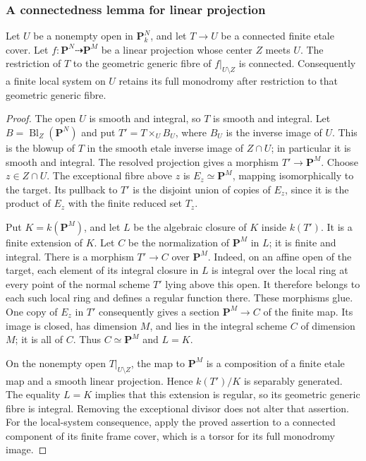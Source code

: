 \subsubsection{A connectedness lemma for linear projection}

\begin{lemma}\label{lem:linear-projection-monodromy}
Let $U$ be a nonempty open in $\mathbf P^N_k$, and let
$T\to U$ be a connected finite etale cover.  Let
$f:\mathbf P^N\dashrightarrow\mathbf P^M$ be a linear projection
whose center $Z$ meets $U$.  The restriction of $T$ to the
geometric generic fibre of $f|_{U\setminus Z}$ is connected.
Consequently a finite local system on $U$ retains its full
monodromy after restriction to that geometric generic fibre.
\end{lemma}

\begin{proof}
The open $U$ is smooth and integral, so $T$ is smooth and integral.
Let $B=\operatorname{Bl}_Z(\mathbf P^N)$ and put
$T'=T\times_U B_U$, where $B_U$ is the inverse image of $U$.
This is the blowup of $T$ in the smooth etale inverse image of
$Z\cap U$; in particular it is smooth and integral.  The resolved
projection gives a morphism $T'\to\mathbf P^M$.
Choose $z\in Z\cap U$.  The exceptional fibre above $z$ is
$E_z\simeq\mathbf P^M$, mapping isomorphically to the target.
Its pullback to $T'$ is the disjoint union of copies of $E_z$,
since it is the product of $E_z$ with the finite reduced set $T_z$.

Put $K=k(\mathbf P^M)$, and let $L$ be the algebraic closure of $K$
inside $k(T')$.  It is a finite extension of $K$.  Let $C$ be the
normalization of $\mathbf P^M$ in $L$; it is finite and integral.
There is a morphism $T'\to C$ over $\mathbf P^M$.  Indeed, on an
affine open of the target, each element of its integral closure
in $L$ is integral over the local ring at every point of the
normal scheme $T'$ lying above this open.  It therefore belongs
to each such local ring and defines a regular function there.
These morphisms glue.  One copy of $E_z$ in $T'$ consequently
gives a section $\mathbf P^M\to C$ of the finite map.
Its image is closed, has dimension $M$, and lies in the integral
scheme $C$ of dimension $M$; it is all of $C$.  Thus $C\simeq
\mathbf P^M$ and $L=K$.

On the nonempty open $T|_{U\setminus Z}$, the map to $\mathbf P^M$
is a composition of a finite etale map and a smooth linear
projection.  Hence $k(T')/K$ is separably generated.  The equality
$L=K$ implies that this extension is regular, so its geometric
generic fibre is integral.  Removing the exceptional divisor
does not alter that assertion.  For the local-system consequence,
apply the proved assertion to a connected component of its finite
frame cover, which is a torsor for its full monodromy image.
\end{proof}

